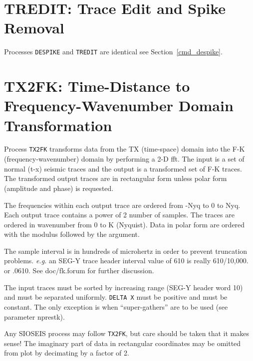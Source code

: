 \section{TREDIT: Trace Edit and Spike Removal}
\label{cmd_tredit}

Processes \texttt{DESPIKE} and \texttt{TREDIT} are identical see Section~\ref{cmd_despike}.

\section{TX2FK: Time-Distance to Frequency-Wavenumber Domain Transformation}
\label{cmd_tx2fk}

Process \texttt{TX2FK} transforms data from the TX (time-space) domain into the
F-K (frequency-wavenumber) domain by performing a 2-D \gls{fft}.  The input
is a set of normal (t-x) seismic traces and the output is a transformed
set of F-K traces. The transformed output traces are in rectangular
form unless polar form (amplitude and phase) is requested.

The frequencies within each output trace are ordered from -Nyq to 0 to
Nyq.  Each output trace contains a power of 2 number of samples. The
traces are ordered in wavenumber from 0 to K (Nyquist). Data in polar
form are ordered with the modulus followed by the argument.

The sample interval is in hundreds of microhertz in order to prevent
truncation problems.  \textit{e.g.} an SEG-Y trace header interval value of 610
is really 610/10,000. or .0610.  See doc/fk.forum for further discussion.

The input traces must be sorted by increasing range (SEG-Y header
word 10) and must be separated uniformly.  \texttt{DELTA X} must be positive
and must be constant.  The only exception is when ``super-\glspl{gather}''
are to be used (see parameter nprestk).

Any SIOSEIS process may follow \texttt{TX2FK}, but care should be taken that it
makes sense!  The imaginary part of data in rectangular coordinates may
be omitted from plot by decimating by a factor of 2.

